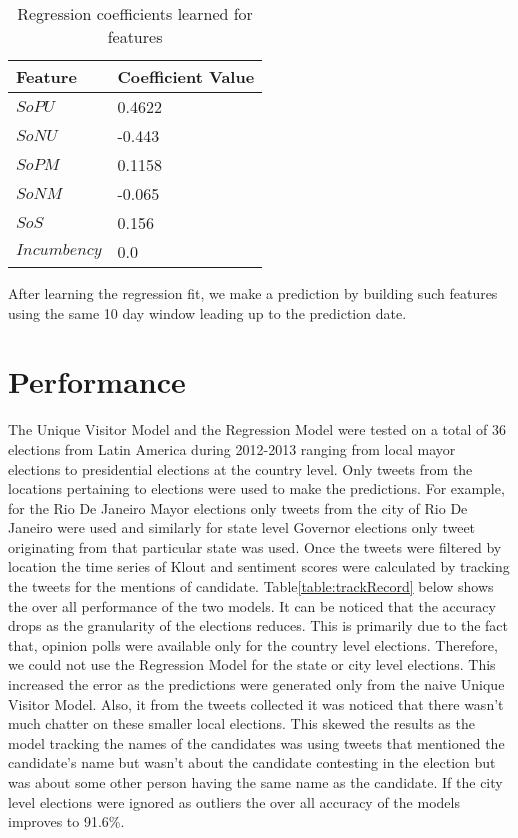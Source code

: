 \begin{table*}
        \centering
        \begin{tabular}{| l | l |}
        \hline
        Feature & Coefficient Value\\
        \hline
        $SoPU$ & 0.4622\\
        $SoNU$ & -0.443\\
        $SoPM$ & 0.1158\\
        $SoNM$ & -0.065\\
        $SoS$ & 0.156\\
        $Incumbency$ & 0.0\\
        \hline
        \end{tabular}
        \vspace{-0.5em}
        \caption{Regression coefficients learned for features}
        \label{table:coeff}
        \vspace{-0.5em}
\end{table*}

After learning the regression fit, we make a prediction by building such features using the same 10 day window leading up to the prediction date.
\section{Performance}
The Unique Visitor Model and the Regression Model were tested on a total of 36 elections from Latin America during 2012-2013 ranging from local mayor elections to presidential elections at the country level.
Only tweets from the locations pertaining to elections were used to make the predictions.
For example, for the Rio De Janeiro Mayor elections only tweets from the city of Rio De Janeiro were used and similarly for state level Governor elections only tweet originating from that particular state was used.
Once the tweets were filtered by location the time series of Klout and sentiment scores were calculated by tracking the tweets for the mentions of candidate.
Table\ref{table:trackRecord} below shows the over all performance of the two models. 
It can be noticed that the accuracy drops as the granularity of the elections reduces. 
This is primarily due to the fact that, opinion polls were available only for the country level elections.
Therefore, we could not use the Regression Model for the state or city level elections.
This increased the error as the predictions were generated only from the naive Unique Visitor Model.
Also, it from the tweets collected it was noticed that there wasn't much chatter on these smaller local elections.
This skewed the results as the model tracking the names of the candidates was using tweets that mentioned the candidate's name but wasn't about the candidate contesting in the election but was about some other person having the same name as the candidate.
If the city level elections were ignored as outliers the over all accuracy of the models improves to 91.6\%.

